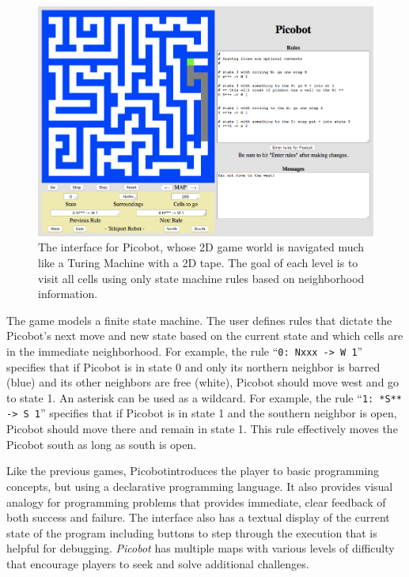 \documentclass{sig-alternate-05-2015}
\begin{document}
\begin{figure}[tb]
\centering
\includegraphics[width=\linewidth]{images/image02.png}
\caption{The interface for Picobot, whose 2D game world is navigated much like a Turing Machine with a 2D tape. The goal of each level is to visit all cells using only state machine rules based on neighborhood information.}
\label{figure:picobot}
\end{figure}


The game models a finite state machine. The user defines rules that dictate the Picobot's next move and new state based on the current state and which cells are in the immediate neighborhood. For example, the rule ``{\tt 0: Nxxx -> W 1}'' specifies that if Picobot is in state 0 and only its northern neighbor is barred (blue) and its other neighbors are free (white), Picobot should move west and go to state 1. An asterisk can be used as a wildcard. For example, the rule ``{\tt 1: *S** -> S 1}'' specifies that if Picobot is in state 1 and the southern neighbor is open, Picobot should move there and remain in state 1. This rule effectively moves the Picobot south as long as south is open.



Like the previous games, Picobot{\em  }introduces the player to basic programming concepts, but using a declarative programming language. It also provides visual analogy for programming problems that provides immediate, clear feedback of both success and failure. The interface also has a textual display of the current state of the program including buttons to step through the execution that is helpful for debugging. {\em Picobot} has multiple maps with various levels of difficulty that encourage players to seek and solve additional challenges. 
\end{document}
